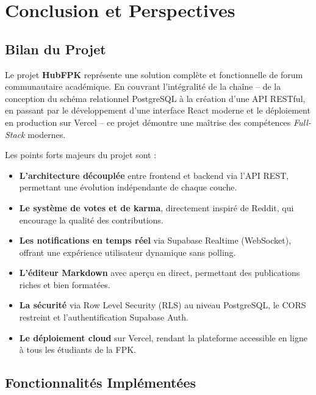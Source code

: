 \documentclass[12pt, a4paper]{report}
\begin{document}
\chapter{Conclusion et Perspectives}

\section{Bilan du Projet}

Le projet \textbf{HubFPK} représente une solution complète et fonctionnelle de forum communautaire académique. En couvrant l'intégralité de la chaîne -- de la conception du schéma relationnel PostgreSQL à la création d'une API RESTful, en passant par le développement d'une interface React moderne et le déploiement en production sur Vercel -- ce projet démontre une maîtrise des compétences \textit{Full-Stack} modernes.

Les points forts majeurs du projet sont :

\begin{itemize}
    \item \textbf{L'architecture découplée} entre frontend et backend via l'API REST, permettant une évolution indépendante de chaque couche.
    \item \textbf{Le système de votes et de karma}, directement inspiré de Reddit, qui encourage la qualité des contributions.
    \item \textbf{Les notifications en temps réel} via Supabase Realtime (WebSocket), offrant une expérience utilisateur dynamique sans polling.
    \item \textbf{L'éditeur Markdown} avec aperçu en direct, permettant des publications riches et bien formatées.
    \item \textbf{La sécurité} via Row Level Security (RLS) au niveau PostgreSQL, le CORS restreint et l'authentification Supabase Auth.
    \item \textbf{Le déploiement cloud} sur Vercel, rendant la plateforme accessible en ligne à tous les étudiants de la FPK.
\end{itemize}

\section{Fonctionnalités Implémentées}
\end{document}
